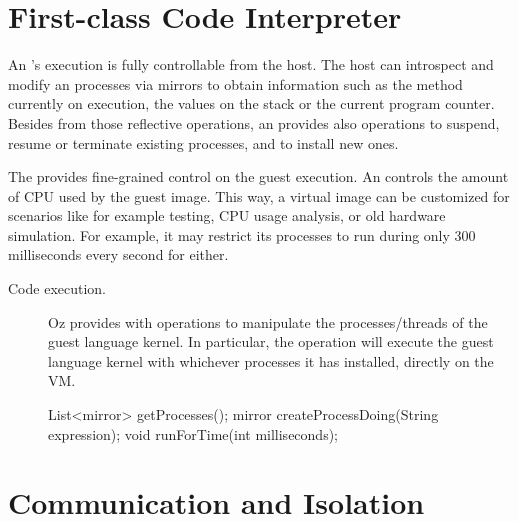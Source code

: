 \section{First-class Code Interpreter} \label{sec:execution}

An \objectspace's execution is fully controllable from the host. The host can introspect and modify an \objectspace processes via mirrors to obtain information such as the method currently on execution, the values on the stack or the current program counter. Besides from those reflective operations, an \objectspace provides also operations to suspend, resume or terminate existing processes, and to install new ones.

The \objectspace provides fine-grained control on the guest execution. An \objectspace controls the amount of CPU used by the guest image. This way, a virtual image can be customized for scenarios like for example testing, CPU usage analysis, or old hardware simulation. For example, it may restrict its processes to run during only 300 milliseconds every second for either.


\begin{description}
\item[Code execution.] Oz provides with operations to manipulate the processes/threads of the guest language kernel. In particular, the  operation will execute the guest language kernel with whichever processes it has installed, directly on the VM.
\begin{code}
List<mirror> getProcesses();
mirror createProcessDoing(String expression);
void runForTime(int milliseconds);
\end{code}
\end{description}

\section{Communication and Isolation} \label{sec:communication}\label{sec:isolation}


